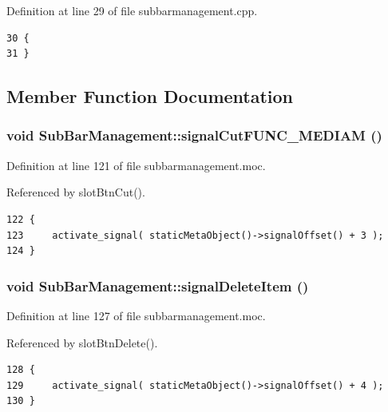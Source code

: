 Definition at line 29 of file subbarmanagement.cpp.



\footnotesize\begin{verbatim}30 {
31 }
\end{verbatim}\normalsize 


\subsection{Member Function Documentation}
\subsubsection{\setlength{\rightskip}{0pt plus 5cm}void Sub\-Bar\-Management::signal\-Cut\-FUNC\_\-MEDIAM ()\hspace{0.3cm}{\tt  [signal]}}\label{classSubBarManagement_SubBarManagementl3}




Definition at line 121 of file subbarmanagement.moc.

Referenced by slot\-Btn\-Cut().



\footnotesize\begin{verbatim}122 {
123     activate_signal( staticMetaObject()->signalOffset() + 3 );
124 }
\end{verbatim}\normalsize 
{}
\subsubsection{\setlength{\rightskip}{0pt plus 5cm}void Sub\-Bar\-Management::signal\-Delete\-Item ()\hspace{0.3cm}{\tt  [signal]}}\label{classSubBarManagement_SubBarManagementl4}




Definition at line 127 of file subbarmanagement.moc.

Referenced by slot\-Btn\-Delete().



\footnotesize\begin{verbatim}128 {
129     activate_signal( staticMetaObject()->signalOffset() + 4 );
130 }
\end{verbatim}\normalsize 
{}
